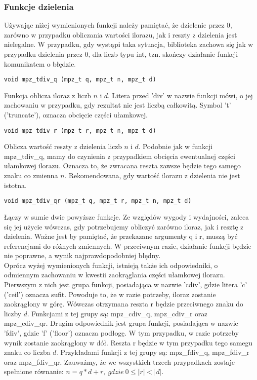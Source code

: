 \documentclass[twoside,a4paper]{book}
\begin{document}
\subsubsection{Funkcje dzielenia}
Używając niżej wymienionych funkcji należy pamiętać, że dzielenie przez $0$, zarówno w przypadku obliczania wartości ilorazu, jak i reszty z dzielenia jest nielegalne. W przypadku, gdy wystąpi taka sytuacja, biblioteka zachowa się jak w przypadku dzielenia przez $0$, dla liczb typu int, tzn. skończy działanie funkcji komunikatem o błędzie.

\begin{lstlisting}
void mpz_tdiv_q (mpz_t q, mpz_t n, mpz_t d)
\end{lstlisting}

Funkcja oblicza iloraz z liczb $n$ i $d$. Litera przed 'div' w nazwie funkcji mówi, o jej zachowaniu w przypadku, gdy rezultat nie jest liczbą całkowitą. Symbol 't' ('truncate'), oznacza obcięcie części ułamkowej.

\begin{lstlisting}
void mpz_tdiv_r (mpz_t r, mpz_t n, mpz_t d)
\end{lstlisting}

Oblicza wartość reszty z dzielenia liczb $n$ i $d$. Podobnie jak w funkcji mpz\_tdiv\_q, mamy do czynienia z przypadkiem obcięcia ewentualnej części ułamkowej ilorazu. Oznacza to, że zwracana reszta zawsze będzie tego samego znaku co zmienna $n$. Rekomendowana, gdy wartość ilorazu z dzielenia nie jest istotna.

\begin{lstlisting}
void mpz_tdiv_qr (mpz_t q, mpz_t r, mpz_t n, mpz_t d)
\end{lstlisting}

Łączy w sumie dwie powyższe funkcje. Ze względów wygody i wydajności, zaleca się jej użycie wówczas, gdy potrzebujemy obliczyć zarówno iloraz, jak i resztę z dzielenia. Ważne jest by pamiętać, że przekazane argumenty q i r, muszą być referencjami do różnych zmiennych. W przeciwnym razie, działanie funkcji będzie nie poprawne, a wynik najprawdopodobniej błędny.\\
Oprócz wyżej wymienionych funkcji, istnieją także ich odpowiedniki, o odmiennym zachowaniu w kwestii zaokrąglania części ułamkowej ilorazu. Pierwszym z nich jest grupa funkcji, posiadająca w nazwie 'cdiv', gdzie litera 'c' ('ceil') oznacza sufit. Powoduje to, że w razie potrzeby, iloraz zostanie zaokrąglony w górę. Wówczas otrzymana reszta r będzie przeciwnego znaku do liczby $d$. Funkcjami z tej grupy są: mpz\_cdiv\_q, mpz\_cdiv\_r oraz mpz\_cdiv\_qr. Drugim odpowiednik jest grupa funkcji, posiadająca w nazwie 'fdiv', gdzie 'f' ('floor') oznacza podłogę. W tym przypadku, w razie potrzeby wynik zostanie zaokrąglony w dół. Reszta r będzie w tym przypadku tego samegu znaku co liczba $d$. Przykładami funkcji z tej grupy są: mpz\_fdiv\_q, mpz\_fdiv\_r oraz mpz\_fdiv\_qr. Zauważmy, że we wszystkich trzech przypadkach zostaje spełnione równanie: $n = q*d+r,\ gdzie\ 0 \le |r| < |d|.$
\end{document}
